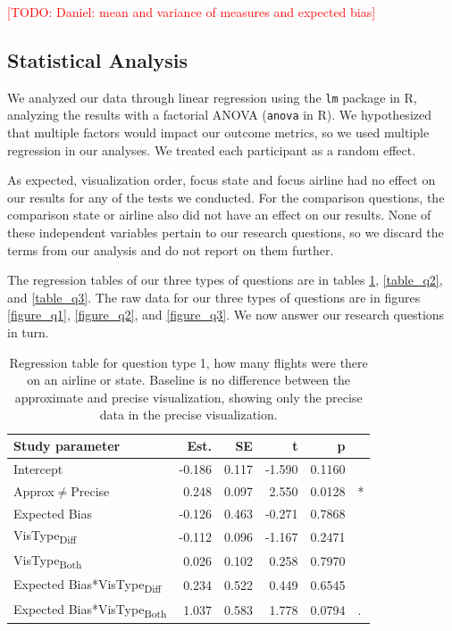 \documentclass[10pt,journal,compsoc]{IEEEtran}
\newcommand{\note}[2]{\textcolor{#1}{[#2]}}
\newcommand{\todo}[1]{\note{red}{TODO: #1}}
\begin{document}
\todo{Daniel: mean and variance of measures and expected bias}

\subsection{Statistical Analysis}

We analyzed our data through linear regression using the \texttt{lm} package in R, analyzing the results with a factorial ANOVA (\texttt{anova} in R).
We hypothesized that multiple factors would impact our outcome metrics, so we used multiple regression in our analyses.
We treated each participant as a random effect.

As expected, visualization order, focus state and focus airline had no effect on our results for any of the tests we conducted.
For the comparison questions, the comparison state or airline also did not have an effect on our results.
None of these independent variables pertain to our research questions, so we discard the terms from our analysis and do not report on them further.

The regression tables of our three types of questions are in tables \ref{table_q1}, \ref{table_q2}, and \ref{table_q3}.
The raw data for our three types of questions are in figures \ref{figure_q1}, \ref{figure_q2}, and \ref{figure_q3}.
We now answer our research questions in turn.

\begin{table}[!t]
\renewcommand{\arraystretch}{1.3}
\caption{Regression table for question type 1, how many flights were there on an airline or state. Baseline is no difference between the approximate and precise visualization, showing only the precise data in the precise visualization.}
\label{table_q1}
\centering
\begin{tabular}{|l||r|r|r|r@{}l|}
\hline
Study parameter & Est. & SE & t & p & \\
\hline
\hline
Intercept & -0.186 & 0.117 & -1.590 & 0.1160 &  \\
\hline
Approx$\neq$Precise & 0.248 & 0.097 & 2.550 & 0.0128 & * \\
\hline
Expected Bias & -0.126 & 0.463 & -0.271 & 0.7868 &  \\
\hline
VisType\textsubscript{Diff} & -0.112 & 0.096 & -1.167 & 0.2471 &  \\
\hline
VisType\textsubscript{Both} & 0.026 & 0.102 & 0.258 & 0.7970 &  \\
\hline
Expected Bias*VisType\textsubscript{Diff} & 0.234 & 0.522 & 0.449 & 0.6545 &  \\
\hline
Expected Bias*VisType\textsubscript{Both} & 1.037 & 0.583 & 1.778 & 0.0794 & . \\
\hline
\end{tabular}
\end{table}
\end{document}
